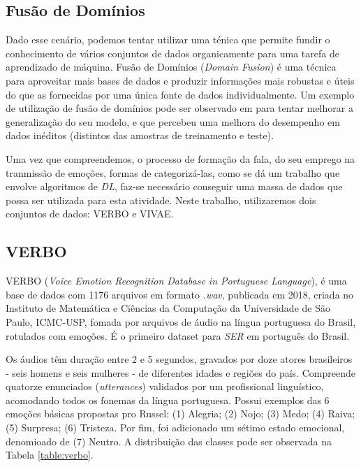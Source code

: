 \subsection{Fusão de Domínios}

Dado esse cenário, podemos tentar utilizar uma ténica que permite fundir o conhecimento de vários conjuntos de dados organicamente para uma tarefa de aprendizado de máquina. Fusão de Domínios \cite{59}(\textit{Domain Fusion}) é uma técnica para aproveitar mais bases de dados e produzir informações mais robustas e úteis do que as fornecidas por uma única fonte de dados individualmente. Um exemplo de utilização de fusão de domínios pode ser observado em \cite{3} para tentar melhorar a generalização do seu modelo, e que percebeu uma melhora do desempenho em dados inéditos (distintos das amostras de treinamento e teste).

Uma vez que compreendemos, o processo de formação da fala, do seu emprego na tranmissão de emoções, formas de categorizá-las, como se dá um trabalho que envolve algoritmos de \textit{DL}, faz-se necessário conseguir uma massa de dados que possa ser utilizada para esta atividade. Neste trabalho, utilizaremos dois conjuntos de dados: VERBO e VIVAE.

\subsection{VERBO}

VERBO \cite{12.21} (\textit{Voice Emotion Recognition Database in Portuguese Language}),  é uma base de dados com 1176 arquivos em formato \textit{.wav}, publicada em 2018, criada no Instituto de Matemática e Ciências da Computação da Universidade de São Paulo, ICMC-USP, fomada por arquivos de áudio na língua portuguesa do Brasil, rotulados com emoções. É o primeiro \cite{21} dataset para \textit{SER} em português do Brasil.

Os áudios têm duração entre 2 e 5 segundos, gravados por doze atores brasileiros - seis homens e seis mulheres - de diferentes idades e regiões do país. Compreende quatorze enunciados (\textit{utterances}) validados por um profissional linguístico, acomodando todos os fonemas da língua portuguesa. Possui exemplos das 6 emoções básicas propostas pro Russel: (1) Alegria; (2) Nojo; (3) Medo; (4) Raiva; (5) Surpresa; (6) Tristeza. Por fim, foi adicionado um sétimo estado emocional, denomioado de (7) Neutro. A distribuição das classes pode ser observada na Tabela \ref{table:verbo}.

